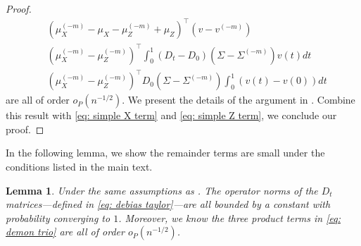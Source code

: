\documentclass[11pt]{article}
\newtheorem{lemma}[theorem]{Lemma}
\begin{document}
\begin{proof}
\begin{equation}
\begin{aligned}
&\left(\mu_X^{(-m)}-\mu_X-\mu_Z^{(-m)}+\mu_Z\right)^{\top}\left(v-v^{(-m)}\right)\\
   & \left(\mu_X^{(-m)}-\mu_Z^{(-m)}\right)^{\top}\int_0^1(D_t-D_0)\left(\Sigma-\Sigma^{(-m)}\right) v(t) d t\\
   & \left(\mu_X^{(-m)}-\mu_Z^{(-m)}\right)^{\top}D_0\left(\Sigma-\Sigma^{(-m)}\right) \int_0^1(v(t)-v(0)) d t
\end{aligned}
\end{equation}
 are all of order $o_P(n^{-1/2})$. We present the details of the argument in . Combine this result with \eqref{eq: simple X term} and \eqref{eq: simple Z term}, we conclude our proof.
\end{proof}

In the following lemma, we show the remainder terms are small under the conditions listed in the main text.
\begin{lemma}\label{lemma: bound terms in remainder}
Under the same assumptions as . The operator norms of the $D_t$ matrices---defined in \eqref{eq: debias taylor}---are all bounded by a constant with probability converging to $1$. Moreover, we know the three product terms in \eqref{eq: demon trio} are all of order $o_P(n^{-1/2})$.
\end{lemma}
\end{document}
